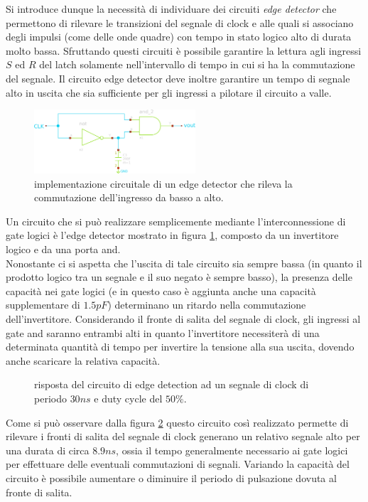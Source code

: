 	Si introduce dunque la necessità di individuare dei circuiti \textit{edge detector} che permettono di rilevare le transizioni del segnale di clock e alle quali si associano degli impulsi (come delle onde quadre) con tempo in stato logico alto di durata molto bassa. Sfruttando questi circuiti è possibile garantire la lettura agli ingressi $S$ ed $R$ del latch solamente nell'intervallo di tempo in cui si ha la commutazione del segnale. Il circuito edge detector deve inoltre garantire un tempo di segnale alto in uscita che sia sufficiente per gli ingressi a pilotare il circuito a valle.
	
	\begin{figure}[bht]
		\centering
		\includegraphics[width=6cm]{Immagini/edge-detector}
		\caption{implementazione circuitale di un edge detector che rileva la commutazione dell'ingresso da basso a alto.}
		\label{fig:srl:edgedetector}
	\end{figure}
	
	Un circuito che si può realizzare semplicemente mediante l'interconnessione di gate logici è l'edge detector mostrato in figura \ref{fig:srl:edgedetector}, composto da un invertitore logico e da una porta and.\\
	Nonostante ci si aspetta che l'uscita di tale circuito sia sempre bassa (in quanto il prodotto logico tra un segnale e il suo negato è sempre basso), la presenza delle capacità nei gate logici (e in questo caso è aggiunta anche una capacità supplementare di $1.5pF$) determinano un ritardo nella commutazione dell'invertitore. Considerando il fronte di salita del segnale di clock, gli ingressi al gate and saranno entrambi alti in quanto l'invertitore necessiterà di una determinata quantità di tempo per invertire la tensione alla sua uscita, dovendo anche scaricare la relativa capacità.
	\begin{figure}[bht]
		\centering
		
		\vspace{3mm}
		\caption{risposta del circuito di edge detection ad un segnale di clock di periodo $30ns$ e duty cycle del $50\%$.}
		\label{fig:srl:edgesimulation}
	\end{figure}
	
	Come si può osservare dalla figura \ref{fig:srl:edgesimulation} questo circuito così realizzato permette di rilevare i fronti di salita del segnale di clock generano un relativo segnale alto per una durata di circa $8.9ns$, ossia il tempo generalmente necessario ai gate logici per effettuare delle eventuali commutazioni di segnali. Variando la capacità del circuito è possibile aumentare o diminuire il periodo di pulsazione dovuta al fronte di salita.
	
